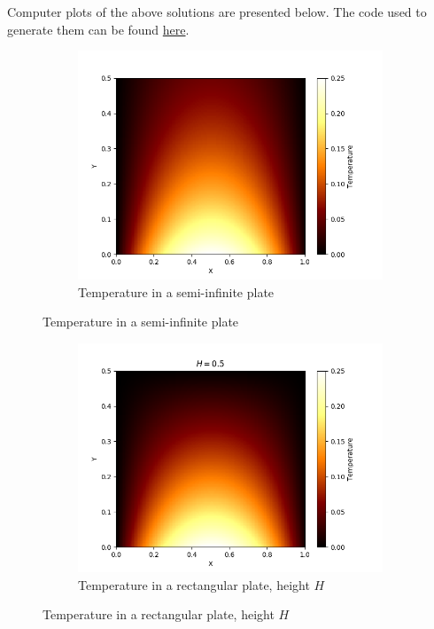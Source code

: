 \documentclass[10pt]{article}
\begin{document}
        Computer plots of the above solutions are presented below. The code used to generate them can be found
        \href{https://gist.github.com/sahasatvik/b51aeafe25c88996d3d812580e04b09c}{here}.
        
        \begin{figure}[h]
        \centering
        \begin{subfigure}[b]{0.9\textwidth}
                \includegraphics[width=\textwidth]{./semi_infinite_plate.png}
                \caption{Temperature in a semi-infinite plate}
        \end{subfigure}
        \end{figure}
        \begin{figure}[h]\ContinuedFloat
        \centering
        \begin{subfigure}[b]{0.9\textwidth}
                \includegraphics[width=\textwidth]{./finite_plate.png}
                \caption{Temperature in a rectangular plate, height $H$}
        \end{subfigure}
        \end{figure}
\end{document}
